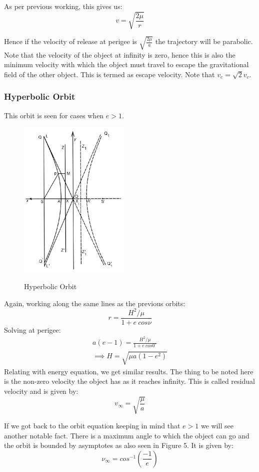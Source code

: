 \documentclass[12pt, letterpaper]{article}
\begin{document}
As per previous working, this gives us:
\[ v = \sqrt{\frac{2\mu}{r}} \]

Hence if the velocity of release at perigee is $\sqrt{\frac{2\mu}{a}}$ the trajectory will be parabolic. Note that the velocity of the object at infinity is zero, hence this is also the minimum velocity with which the object must travel to escape the gravitational field of the other object. This is termed as escape velocity. Note that $v_e = \sqrt{2}v_c$.
\newpage
\subsubsection{Hyperbolic Orbit}
This orbit is seen for cases when $e>1$. 
\begin{figure}[ht]
	\centering
    \includegraphics[width = 200px]{hyperbola}
    \label{fig:hyperbola}
    \caption{Hyperbolic Orbit}
\end{figure}

Again, working along the same lines as the previous orbits:
\[ r = \frac{H^2/\mu}{1+e\:cos\nu} \]
Solving at perigee:
\begin{gather*}
	a(e-1) = \frac{H^2/\mu}{1+e\:cos0^\circ}\\
	\implies H = \sqrt{\mu a(1-e^2)}
\end{gather*}
Relating with energy equation, we get similar results. The thing to be noted here is the non-zero velocity the object has as  it reaches infinity. This is called residual velocity and is given by:
\[ 
	v_\infty = \sqrt{\frac{\mu}{a}}
\]

If we got back to the orbit equation keeping in mind that $e>1$ we will see another notable fact. There is a maximum angle to which the object can go and the orbit is bounded by asymptotes as also seen in Figure 5. It is given by:
\[
	\nu_\infty = cos^{-1}\left( \frac{-1}{e} \right)
\]
\end{document}
